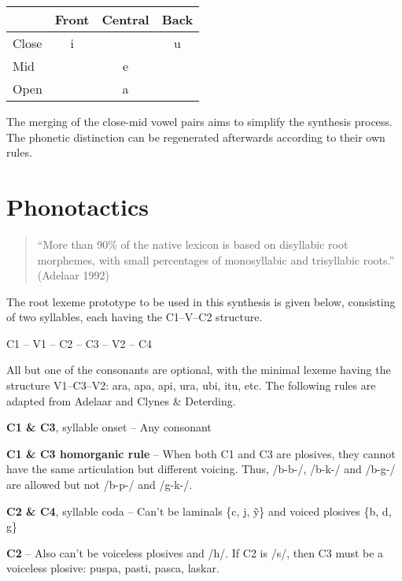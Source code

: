 \documentclass{article}
\begin{document}
\begin{center}
	\begin{tabular}{l c c c}
		\toprule
		      & Front & Central & Back \\ \midrule
		Close & i     &         & u    \\
		Mid   &       & e       &      \\
		Open  &       & a       &      \\ \bottomrule
	\end{tabular}
\end{center} \bigskip

The merging of the close-mid vowel pairs aims to simplify the synthesis process. The phonetic distinction can be regenerated afterwards according to their own rules.

\pagebreak
\section{Phonotactics}

\begin{quote}
	``More than 90\% of the native lexicon is based on disyllabic root morphemes, with small percentages of monosyllabic and trisyllabic roots.'' (Adelaar 1992)
\end{quote}

The root lexeme prototype to be used in this synthesis is given below, consisting of two syllables, each having the C1--V--C2 structure.

\begin{center}
	C1 -- V1 -- C2 -- C3 -- V2 -- C4
\end{center}

All but one of the consonants are optional, with the minimal lexeme having the structure V1--C3--V2: ara, apa, api, ura, ubi, itu, etc. The following rules are adapted from Adelaar and Clynes \& Deterding.

\textbf{C1 \& C3}, syllable onset -- Any consonant

\textbf{C1 \& C3 homorganic rule} -- When both C1 and C3 are plosives, they cannot have the same articulation but different voicing. Thus, /b-b-/, /b-k-/ and /b-g-/ are allowed but not /b-p-/ and /g-k-/.

\textbf{C2 \& C4}, syllable coda -- Can't be laminals \{c, j, \~y\} and voiced plosives \{b, d, g\}

\textbf{C2} -- Also can't be voiceless plosives and /h/. If C2 is /s/, then C3 must be a voiceless plosive: puspa, pasti, pasca, laskar.
\end{document}
